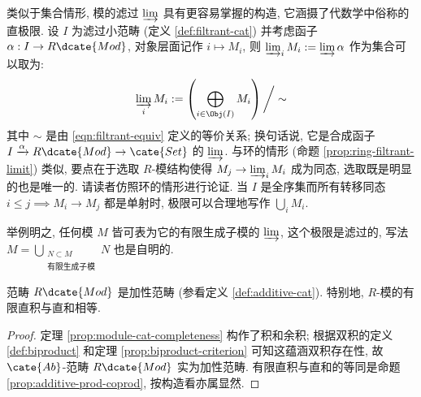 \begin{remark}\label{rem:filtrant-mod-limit}
	类似于集合情形, 模的滤过 $\varinjlim$ 具有更容易掌握的构造, 它涵摄了代数学中俗称的直极限. 设 $I$ 为滤过小范畴 (定义 \ref{def:filtrant-cat}) 并考虑函子 $\alpha: I \to R\dcate{Mod}$, 对象层面记作 $i \mapsto M_i$, 则 $\varinjlim_i M_i := \varinjlim \alpha$ 作为集合可以取为:
	\[ \varinjlim_i M_i := \left( \bigoplus_{i \in \Obj(I)} M_i \right) \bigg/\sim \]
	其中 $\sim$ 是由 \eqref{eqn:filtrant-equiv} 定义的等价关系; 换句话说, 它是合成函子 $I \xrightarrow{\alpha} R\dcate{Mod} \to \cate{Set}$ 的 $\varinjlim$. 与环的情形 (命题 \ref{prop:ring-filtrant-limit}) 类似, 要点在于选取 $R$-模结构使得 $M_j \to \varinjlim_i M_i$ 成为同态, 选取既是明显的也是唯一的. 请读者仿照环的情形进行论证. 当 $I$ 是全序集而所有转移同态 $i \leq j \implies M_i \to M_j$ 都是单射时, 极限可以合理地写作 $\bigcup_i M_i$.
\end{remark}

举例明之, 任何模 $M$ 皆可表为它的有限生成子模的 $\varinjlim$, 这个极限是滤过的, 写法 $M = \bigcup_{\substack{N \subset M \\ \text{有限生成子模}}} N$ 也是自明的.

\begin{corollary}\label{prop:Mod-cat-additive}
	范畴 $R\dcate{Mod}$ 是加性范畴 (参看定义 \ref{def:additive-cat}). 特别地, $R$-模的有限直积与直和相等.
\end{corollary}
\begin{proof}
	定理 \ref{prop:module-cat-completeness} 构作了积和余积; 根据双积的定义 \ref{def:biproduct} 和定理 \ref{prop:biproduct-criterion} 可知这蕴涵双积存在性, 故 $\cate{Ab}$-范畴 $R\dcate{Mod}$ 实为加性范畴. 有限直积与直和的等同是命题 \ref{prop:additive-prod-coprod}, 按构造看亦属显然.
\end{proof}


